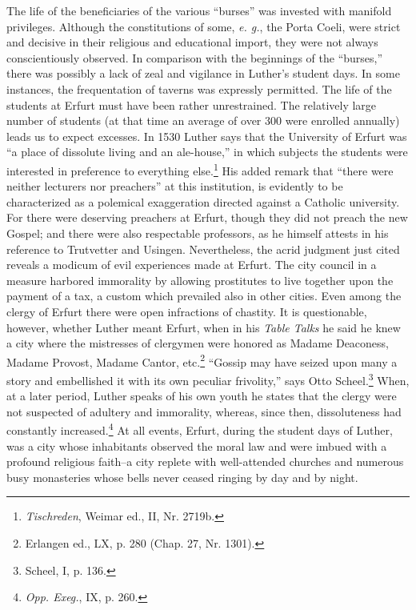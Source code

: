 The life of the beneficiaries of the various “burses” was invested
with manifold privileges. Although the constitutions of some, \textit{e. g.},
the Porta Coeli, were strict and decisive in their religious and educational import, they were not always conscientiously observed. In comparison with the beginnings of the “burses,” there was possibly a lack
of zeal and vigilance in Luther’s student days. In some instances, the
frequentation of taverns was expressly permitted. The life of the
students at Erfurt must have been rather unrestrained. The relatively
large number of students (at that time an average of over 300 were
enrolled annually) leads us to expect excesses. In 1530 Luther says
that the University of Erfurt was “a place of dissolute living and an
ale-house,” in which subjects the students were interested in preference
to everything else.\footnote{\textit{Tischreden}, Weimar ed., II, Nr. 2719b.}
His added remark that “there were neither lecturers
nor preachers” at this institution, is evidently to be characterized as
a polemical exaggeration directed against a Catholic university. For
there were deserving preachers at Erfurt, though they did not preach
the new Gospel; and there were also respectable professors, as he
himself attests in his reference to Trutvetter and Usingen. Nevertheless, the acrid judgment just cited reveals a modicum of evil experiences made at Erfurt. The city council in a measure harbored immorality by allowing prostitutes to live together upon the payment
of a tax, a custom which prevailed also in other cities. Even among
the clergy of Erfurt there were open infractions of chastity. It is
questionable, however, whether Luther meant Erfurt, when in his
\textit{Table Talks} he said he knew a city where the mistresses of clergymen
were honored as Madame Deaconess, Madame Provost, Madame Cantor, etc.\footnote{Erlangen ed., LX, p. 280 (Chap. 27, Nr. 1301).}
“Gossip may have seized upon many a story and embellished it with its own peculiar frivolity,” says Otto Scheel.\footnote{Scheel, I, p. 136.}
When, at a later period, Luther speaks of his own youth he states that the
clergy were not suspected of adultery and immorality, whereas, since
then, dissoluteness had constantly increased.\footnote{\textit{Opp. Exeg.}, IX, p. 260.}
At all events, Erfurt,
during the student days of Luther, was a city whose inhabitants observed
the moral law and were imbued with a profound religious
faith--a city replete with well-attended churches and numerous busy
monasteries whose bells never ceased ringing by day and by night.

